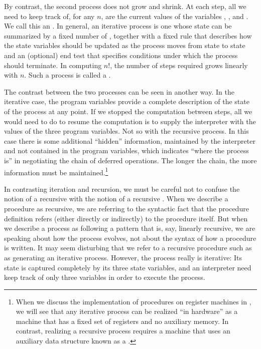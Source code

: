 By contrast, the second process does not grow and shrink.  At each step, all we
need to keep track of, for any \( n \), are the current values of the variables
, , and .  We call this an
.  In general, an iterative process is one whose
state can be summarized by a fixed number of ,
together with a fixed rule that describes how the state variables should be
updated as the process moves from state to state and an (optional) end test
that specifies conditions under which the process should terminate.  In
computing \( n! \), the number of steps required grows linearly with \( n \).  Such
a process is called a .

The contrast between the two processes can be seen in another way.  In the
iterative case, the program variables provide a complete description of the
state of the process at any point.  If we stopped the computation between
steps, all we would need to do to resume the computation is to supply the
interpreter with the values of the three program variables.  Not so with the
recursive process.  In this case there is some additional ``hidden''
information, maintained by the interpreter and not contained in the program
variables, which indicates ``where the process is'' in negotiating the chain of
deferred operations.  The longer the chain, the more information must be
maintained.\footnote{When we discuss the implementation of procedures on
register machines in , we will see that any iterative process
can be realized ``in hardware'' as a machine that has a fixed set of registers
and no auxiliary memory.  In contrast, realizing a recursive process requires a
machine that uses an auxiliary data structure known as a .}

In contrasting iteration and recursion, we must be careful not to confuse the
notion of a recursive  with the notion of a recursive
.  When we describe a procedure as recursive, we are
referring to the syntactic fact that the procedure definition refers (either
directly or indirectly) to the procedure itself.  But when we describe a
process as following a pattern that is, say, linearly recursive, we are
speaking about how the process evolves, not about the syntax of how a procedure
is written.  It may seem disturbing that we refer to a recursive procedure such
as  as generating an iterative process.  However, the process
really is iterative: Its state is captured completely by its three state
variables, and an interpreter need keep track of only three variables in order
to execute the process.

